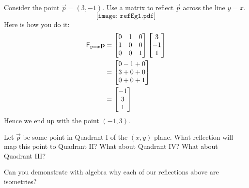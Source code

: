 \documentclass{ximera}
\begin{document}
\begin{example}
Consider the point $\vec{p} =(3,-1)$.  Use a matrix to reflect
$\vec{p}$ across the line $y = x$.
\[
\texttt{[image: refEg1.pdf]}
\]
Here is how you do it:
\begin{align*}
\mathsf{F}_{y = x} \mathbf{p} &= 
\begin{bmatrix}
0 & 1 & 0 \\ 
1 & 0 & 0 \\
0 & 0 & 1
\end{bmatrix}
\begin{bmatrix}
3 \\
-1 \\
1
\end{bmatrix}\\
&=
\begin{bmatrix}
0-1+0\\
3+0+0 \\
0+0+1
\end{bmatrix}\\
&=
\begin{bmatrix}
-1\\
3 \\
1
\end{bmatrix}
\end{align*}
Hence we end up with the point $(-1,3)$. 
\end{example}

\begin{question}
Let $\vec{p}$ be some point in Quadrant I of the $(x,y)$-plane. What
reflection will map this point to Quadrant II? What about Quadrant IV?
What about Quadrant III?
\end{question}



\begin{question} 
Can you demonstrate with algebra why each of our reflections above are
isometries?
\end{question}
\end{document}
